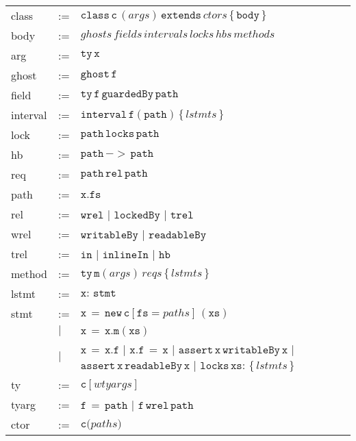\begin{tabular}{llll}
class & :=
     & $\mathtt{class}\,\mathtt{c}\,(args)\,\mathtt{extends}\,ctors\,\{\,\mathtt{body}\,\}$ & \\
body & :=
     & $ghosts\,fields\,intervals\,locks\,hbs\,methods$ & \\
arg & :=
     & $\mathtt{ty}\,\mathtt{x}$ & \\
ghost & :=
     & $\mathtt{ghost}\,\mathtt{f}$ & \\
field & :=
     & $\mathtt{ty}\,\mathtt{f}\,\mathtt{guardedBy}\,\mathtt{path}$ & \\
interval & :=
     & $\mathtt{interval}\,\mathtt{f}(\mathtt{path})\,\mathtt{\{}\,lstmts\,\mathtt{\}}$ & \\
lock & :=
     & $\mathtt{path}\,\mathtt{locks}\,\mathtt{path}$ & \\
hb & :=
     & $\mathtt{path}\,\mathtt{->}\,\mathtt{path}$ & \\
req & :=
     & $\mathtt{path}\,\mathtt{rel}\,\mathtt{path}$ & \\
path & :=
     & $\mathtt{x}.\mathtt{fs}$ & \\
rel & :=
     & $\mathtt{wrel}$
     $\mid$ $\mathtt{lockedBy}$
     $\mid$ $\mathtt{trel}$ & \\
wrel & :=
     & $\mathtt{writableBy}$
     $\mid$ $\mathtt{readableBy}$ & \\
trel & :=
     & $\mathtt{in}$
     $\mid$ $\mathtt{inlineIn}$
     $\mid$ $\mathtt{hb}$ & \\
method & :=
     & $\mathtt{ty}\,\mathtt{m}(args)\,reqs\,\mathtt{\{}\,lstmts\,\mathtt{\}}$ & \\
lstmt & :=
     & $\mathtt{x}:\,\mathtt{stmt}$ & \\
stmt & :=
     & $\mathtt{x}\,\mathtt{=}\,\mathtt{new}\,\mathtt{c}[\mathtt{fs}\mathtt{=}paths]\,(\mathtt{xs})$ &  \\
     & $\mid$ & $\mathtt{x}\,\mathtt{=}\,\mathtt{x}.\mathtt{m}(\mathtt{xs})$ &  \\
     & $\mid$ & $\mathtt{x}\,\mathtt{=}\,\mathtt{x}.\mathtt{f}$
     $\mid$ $\mathtt{x}.\mathtt{f}\,\mathtt{=}\,\mathtt{x}$
     $\mid$ $\mathtt{assert}\,\mathtt{x}\,\mathtt{writableBy}\,\mathtt{x}$
     $\mid$ $\mathtt{assert}\,\mathtt{x}\,\mathtt{readableBy}\,\mathtt{x}$
     $\mid$ $\mathtt{locks}\,\mathtt{xs}:\,\mathtt{\{}\,lstmts\,\mathtt{\}}$ & \\
ty & :=
     & $\mathtt{c}[wtyargs]$ & \\
tyarg & :=
     & $\mathtt{f}\,\mathtt{=}\,\mathtt{path}$
     $\mid$ $\mathtt{f}\,\mathtt{wrel}\,\mathtt{path}$ & \\
ctor & :=
     & $\mathtt{c}\mathtt{(}paths\mathtt{)}$ & \\
\end{tabular}
